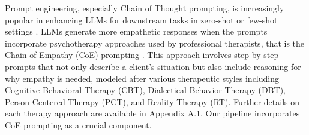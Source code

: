 Prompt engineering, especially Chain of Thought prompting, is increasingly popular in enhancing LLMs for downstream tasks in zero-shot or few-shot settings \cite{wei2022chain}. LLMs generate more empathetic responses when the prompts incorporate psychotherapy approaches used by professional therapists, that is the Chain of Empathy (CoE) prompting \cite{lee2023chain}. 
 This approach involves step-by-step prompts that not only describe a client’s situation but also include reasoning for why empathy is needed, modeled after various therapeutic styles including Cognitive Behavioral Therapy (CBT), Dialectical Behavior Therapy (DBT), Person-Centered Therapy (PCT), and Reality Therapy (RT). Further details on each therapy approach are available in Appendix A.1. Our pipeline incorporates  CoE prompting as a crucial component.